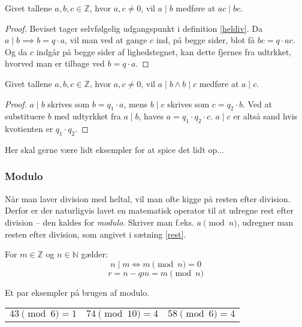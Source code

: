 \begin{sent}
    Givet tallene \(a, b, c \in \mathbb{Z}\), hvor \(a, c \neq 0\), vil \(a \mid b\) medføre at \(a c \mid b c\).
\end{sent}

\begin{proof}
    Beviset tager selvfølgelig udgangspunkt i definition \ref{heldiv}.
    Da \(a \mid b \implies b = q \cdot a\), vil man ved at gange \(c\) ind, på begge sider, blot få \(b c = q \cdot a c\).
    Og da \(c\) indgår på begge sider af lighedstegnet, kan dette fjernes fra udtrkket, hvorved man er tilbage ved \(b = q \cdot a\).
\end{proof}





\begin{sent}
    Givet tallene \(a, b, c \in \mathbb{Z}\), hvor \(a, c \neq 0\), vil \(a \mid b \land b \mid c\) medføre at \(a \mid c\).
\end{sent}

\begin{proof}
    \(a \mid b\) skrives som \(b = q_1 \cdot a\), mens \(b \mid c\) skrives som \(c = q_2 \cdot b\). Ved at substituere \(b\) med udtyrkket fra \(a \mid b\), haves \(a = q_1 \cdot q_2 \cdot c\). \(a \mid c\) er altså sand hvis kvotienten er \(q_1 \cdot q_2\).
\end{proof}


\begin{eks}
    Her skal gerne være lidt eksempler for at spice det lidt op...
\end{eks}



\subsubsection{Modulo}
Når man laver division med heltal, vil man ofte kigge på resten efter division.
Derfor er der naturligvis lavet en matematisk operator til at udregne rest efter division -- den kaldes for \emph{modulo}.
Skriver man f.eks. \(a \pmod{n}\), udregner man resten efter division, som angivet i sætning \ref{rest}.

\begin{definition}
    For \(m \in \mathbb{Z}\) og \(n \in \mathbb{N}\) gælder:
    \[n \mid m \iff m \pmod{n} = 0\]
    \[r = n - q m = m \pmod{n}\]\cite[72]{krypto}
\end{definition}

\begin{eks}
    Et par eksempler på brugen af modulo.
    \begin{center}
        \setlength{\tabcolsep}{20pt} %
        \begin{tabular}{l c r}
            \(43 \pmod{6} = 1\) & \(74 \pmod{10} = 4\) & \(58 \pmod{6} = 4\)
        \end{tabular}
    \end{center}
\end{eks}


